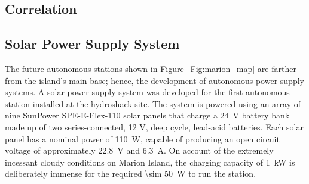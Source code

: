 
\subsection{Correlation}

\subsection{Solar Power Supply System}

The future autonomous stations shown in Figure~\ref{Fig:marion_map} are farther from the island's main base; hence, the development of autonomous power supply systems. A solar power supply system was developed for the first autonomous station installed at the hydroshack site. The system is powered using an array of nine SunPower SPE-E-Flex-110 solar panels that charge a \SI{24}{\volt} battery bank made up of two series-connected, 12 V, deep cycle, lead-acid batteries. Each solar panel has a nominal power of \SI{110}{\watt}, capable of producing an open circuit voltage of approximately \SI{22.8}{\volt} and \SI{6.3}{\ampere}. On account of the extremely incessant cloudy conditions on Marion Island, the charging capacity of \SI{1}{\kilo\watt} is deliberately immense for the required \SI{\sim 50}{\watt} to run the station. 

